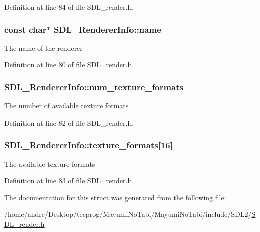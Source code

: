 Definition at line 84 of file S\-D\-L\-\_\-render.\-h.

\hypertarget{struct_s_d_l___renderer_info_a433ecb2865c81ba9f28038e56a4ae6f3}{
\subsubsection[{name}]{\setlength{\rightskip}{0pt plus 5cm}const char$\ast$ S\-D\-L\-\_\-\-Renderer\-Info\-::name}}\label{struct_s_d_l___renderer_info_a433ecb2865c81ba9f28038e56a4ae6f3}
The name of the renderer 

Definition at line 80 of file S\-D\-L\-\_\-render.\-h.

\hypertarget{struct_s_d_l___renderer_info_acdec165b2053b914313f5996983ec6b8}{
\subsubsection[{num\-\_\-texture\-\_\-formats}]{ S\-D\-L\-\_\-\-Renderer\-Info\-::num\-\_\-texture\-\_\-formats}}\label{struct_s_d_l___renderer_info_acdec165b2053b914313f5996983ec6b8}
The number of available texture formats 

Definition at line 82 of file S\-D\-L\-\_\-render.\-h.

\hypertarget{struct_s_d_l___renderer_info_a88450f9d48e593ec4571e3ba7cc3427d}{
\subsubsection[{texture\-\_\-formats}]{ S\-D\-L\-\_\-\-Renderer\-Info\-::texture\-\_\-formats\mbox{[}16\mbox{]}}}\label{struct_s_d_l___renderer_info_a88450f9d48e593ec4571e3ba7cc3427d}
The available texture formats 

Definition at line 83 of file S\-D\-L\-\_\-render.\-h.



The documentation for this struct was generated from the following file\-:\begin{DoxyCompactItemize}
\item 
/home/andre/\-Desktop/tecprog/\-Mayumi\-No\-Tabi/\-Mayumi\-No\-Tabi/include/\-S\-D\-L2/\hyperlink{_s_d_l__render_8h}{S\-D\-L\-\_\-render.\-h}\end{DoxyCompactItemize}
